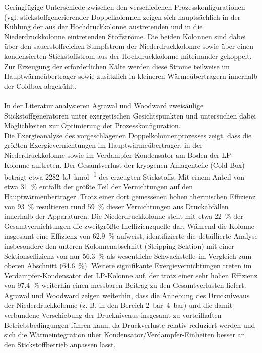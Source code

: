 Geringfügige Unterschiede zwischen den verschiedenen Prozesskonfigurationen (vgl. \cite{agrawalEfficientCryogenicNitrogen1991, nickbockerUllmannsEncyclopediaIndustrial2000, hausenTieftemperaturtechnik1985, heinz-wolfgangharingAirGasesNitrogen2007} stickstoffgenerierender Doppelkolonnen zeigen sich hauptsächlich in der Kühlung der aus der Hochdruckkolonne austretenden und in die Niederdruckkolonne eintretenden Stoffströme. Die beiden Kolonnen sind dabei über den sauerstoffreichen Sumpfstrom der Niederdruckkolonne sowie über einen kondensierten Stickstoffstrom aus der Hochdruckkolonne miteinander gekoppelt. Zur Erzeugung der erforderlichen Kälte werden diese Ströme teilweise im Hauptwärmeübertrager sowie zusätzlich in kleineren Wärmeübertragern innerhalb der Coldbox abgekühlt.\\
\\
In der Literatur analysieren Agrawal und Woodward \cite{agrawalEfficientCryogenicNitrogen1991} zweisäulige Stickstoffgeneratoren unter exergetischen Gesichtspunkten und untersuchen dabei Möglichkeiten zur Optimierung der Prozesskonfiguration. \\
Die Exergieanalyse des vorgeschlagenen Doppelkolonnenprozesses \cite{agrawalEfficientCryogenicNitrogen1991} zeigt, dass die größten Exergievernichtungen im Hauptwärmeübertrager, in der Niederdruckkolonne sowie im Verdampfer-Kondensator am Boden der LP-Kolonne auftreten. Der Gesamtverlust der kryogenen Anlagenteile (Cold Box) beträgt etwa \SI{2282}{\kilo\joule\per\kilo\mole} des erzeugten Stickstoffs. 
Mit einem Anteil von etwa \SI{31}{\percent} entfällt der größte Teil der Vernichtungen auf den Hauptwärmeübertrager. Trotz einer dort gemessenen hohen thermischen Effizienz von \SI{93}{\percent} resultieren rund \SI{59}{\percent} dieser Vernichtungen aus Druckabfällen innerhalb der Apparaturen.
Die Niederdruckkolonne stellt mit etwa \SI{22}{\percent} der 
Gesamtvernichtungen die zweitgrößte Ineffizienzquelle dar. Während die Kolonne insgesamt eine Effizienz von \SI{62.9}{\percent} aufweist, identifizierte die detaillierte Analyse insbesondere den unteren Kolonnenabschnitt (Stripping-Sektion) mit einer Sektionseffizienz von nur \SI{56.3}{\percent} als wesentliche Schwachstelle im Vergleich zum oberen Abschnitt (\SI{64.6}{\percent}). Weitere signifikante Exergievernichtungen treten im Verdampfer-Kondensator der LP-Kolonne auf, der trotz einer sehr hohen Effizienz von \SI{97.4}{\percent} weiterhin einen messbaren Beitrag zu den Gesamtverlusten liefert. \\
Agrawal und Woodward \cite{agrawalEfficientCryogenicNitrogen1991} zeigen weiterhin, dass die Anhebung des Druckniveaus der Niederdruckkolonne (z. B. in den Bereich \SIrange{2}{4}{\bar}) und die damit verbundene Verschiebung der Druckniveaus insgesamt zu vorteilhaften Betriebsbedingungen führen kann, da Druckverluste relativ reduziert werden und sich die Wärmeintegration über Kondensator/Verdampfer-Einheiten besser an den Stickstoffbetrieb anpassen lässt.\\
